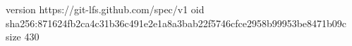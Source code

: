 version https://git-lfs.github.com/spec/v1
oid sha256:871624fb2ca4c31b36c491e2e1a8a3bab22f5746cfce2958b99953be8471b09c
size 430
